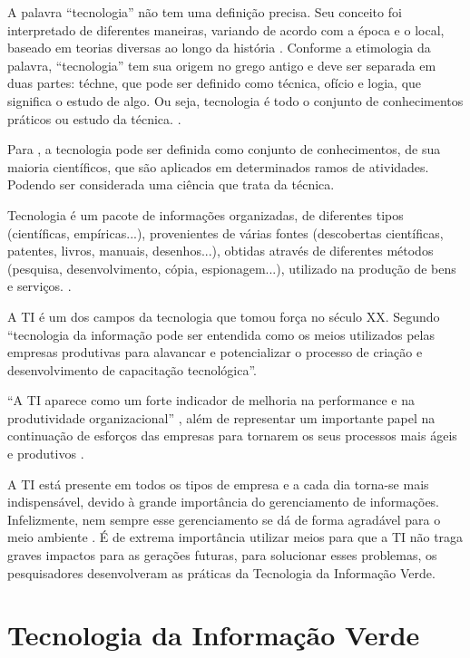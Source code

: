 A palavra “tecnologia” não tem uma definição precisa. Seu conceito foi interpretado de diferentes maneiras, variando de acordo com a época e o local, baseado em teorias diversas ao longo da história \cite{gama1986}. Conforme a etimologia da palavra, “tecnologia” tem sua origem no grego antigo e deve ser separada em duas partes: téchne, que pode ser definido como técnica, ofício e logia, que significa o estudo de algo. Ou seja, tecnologia é todo o conjunto de conhecimentos práticos ou estudo da técnica. \cite{conceito2017}.

Para , a tecnologia pode ser definida como conjunto de conhecimentos, de sua maioria científicos, que são aplicados em determinados ramos de atividades. Podendo ser considerada uma ciência que trata da técnica.

\begin{citacao}
 Tecnologia é um pacote de informações organizadas, de diferentes tipos (científicas, empíricas...), provenientes de várias fontes (descobertas científicas, patentes, livros, manuais, desenhos...), obtidas através de diferentes métodos (pesquisa, desenvolvimento, cópia, espionagem...), utilizado na produção de bens e serviços. \cite{fleury1990capacitaccao}.
\end{citacao} 

A TI é um dos campos da tecnologia que tomou força no século XX. Segundo  “tecnologia da informação pode ser entendida como os meios utilizados pelas empresas produtivas para alavancar e potencializar o processo de criação e desenvolvimento de capacitação tecnológica”.

“A TI aparece como um forte indicador de melhoria na performance e na produtividade organizacional” \cite[p. 2]{lunardi2001efeitos}, além de representar um importante papel na continuação de esforços das empresas para tornarem os seus processos mais ágeis e produtivos \cite{shaw1997information}.

A TI está presente em todos os tipos de empresa e a cada dia torna-se mais indispensável, devido à grande importância do gerenciamento de informações. Infelizmente, nem sempre esse gerenciamento se dá de forma agradável para o meio ambiente \cite[p. 6-7]{silva2011}. É de extrema importância utilizar meios para que a TI não traga graves impactos para as gerações futuras, para solucionar esses problemas, os pesquisadores desenvolveram as práticas da Tecnologia da Informação Verde.


\section{Tecnologia da Informação Verde}

